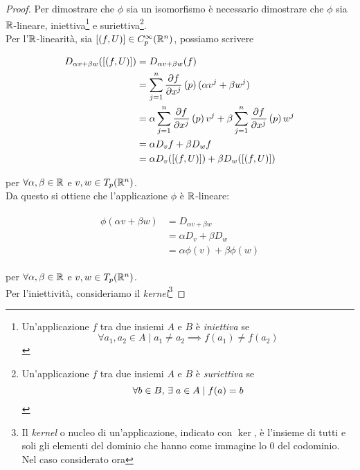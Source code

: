 \begin{proof}
	Per dimostrare che $ \phi $ sia un isomorfismo è necessario dimostrare che $ \phi $ sia $ \mathbb{R} $-lineare, iniettiva\footnote{%
		Un'applicazione $ f $ tra due insiemi $ A $ e $ B $ è \textit{iniettiva} se
		\begin{equation*}
			\forall a_{1},a_{2} \in A \mid a_{1} \neq a_{2} \implies f(a_{1}) \neq f(a_{2})
		\end{equation*}%
	} e suriettiva\footnote{%
		Un'applicazione $ f $ tra due insiemi $ A $ e $ B $ è \textit{suriettiva} se
		\begin{equation*}
			\forall b \in B, \, \exists \; a \in A \mid f(a) = b
		\end{equation*}%
	}.\\
	Per l'$ \mathbb{R} $-linearità, sia $ [(f,U)] \in C_{p}^{\infty}(\mathbb{R}^{n}) $, possiamo scrivere
	
	\begin{align}
		\begin{split}
			D_{\alpha v + \beta w} ([(f,U)]) &= D_{\alpha v + \beta w} (f)\\
			&= \sum_{j=1}^{n} \pdv{f}{x^{j}} \, (p) \, (\alpha v^{j} + \beta w^{j})\\
			&= \alpha \sum_{j=1}^{n} \pdv{f}{x^{j}} \, (p) \, v^{j} + \beta \sum_{j=1}^{n} \pdv{f}{x^{j}} \, (p) \, w^{j}\\
			&= \alpha D_{v} f + \beta D_{w} f\\
			&= \alpha D_{v} ([(f,U)]) + \beta D_{w} ([(f,U)])
		\end{split}
	\end{align}

	per $ \forall \alpha, \beta \in \mathbb{R} $ e $ v, w \in T_{p} (\mathbb{R}^{n}) $.\\
	Da questo si ottiene che l'applicazione $ \phi $ è $ \mathbb{R} $-lineare:
	
	\begin{align}
		\begin{split}
			\phi (\alpha v + \beta w) &= D_{\alpha v + \beta w}\\
			&= \alpha D_{v} + \beta D_{w}\\
			&= \alpha \phi (v) + \beta \phi (w)
		\end{split}
	\end{align}

	per $ \forall \alpha, \beta \in \mathbb{R} $ e $ v, w \in T_{p} (\mathbb{R}^{n}) $.\\
	Per l'iniettività, consideriamo il \textit{kernel}\footnote{%
		Il \textit{kernel} o nucleo di un'applicazione, indicato con $ \ker $, è l'insieme di tutti e soli gli elementi del dominio che hanno come immagine lo $ 0 $ del codominio. Nel caso considerato ora
		
}
\end{proof}
